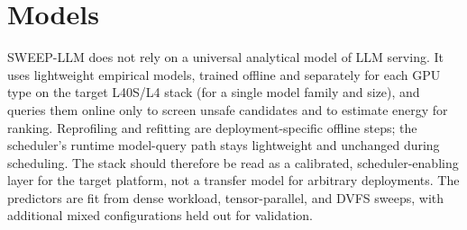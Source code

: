\section{Models}
\label{sec:phase_a_models}

SWEEP-LLM does not rely on a universal analytical model of LLM serving.
It uses lightweight empirical models, trained offline and separately for each GPU type on the target L40S/L4 stack (for a single model family and size), and queries them online only to screen unsafe candidates and to estimate energy for ranking.
Reprofiling and refitting are deployment-specific offline steps; the scheduler's runtime model-query path stays lightweight and unchanged during scheduling.
The stack should therefore be read as a calibrated, scheduler-enabling layer for the target platform, not a transfer model for arbitrary deployments.
The predictors are fit from dense workload, tensor-parallel, and DVFS sweeps, with additional mixed configurations held out for validation.

